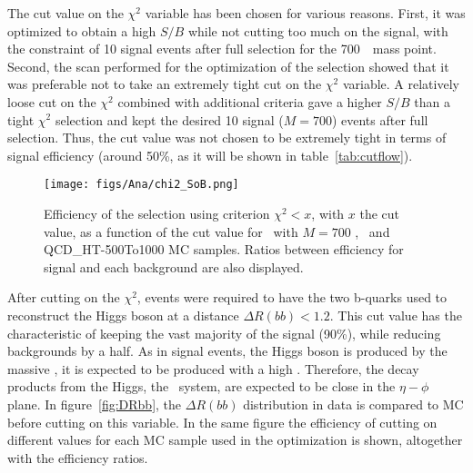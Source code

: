 The cut value on the $\chi^{2}$ variable has been chosen for various reasons. First, it was optimized to obtain a high $S/B$ while not cutting too much on the signal, with the constraint of 10 signal events after full selection for the 700~\GeVcc~mass point. Second, the scan performed for the optimization of the selection showed that it was preferable not to take an extremely tight cut on the $\chi^{2}$ variable. A relatively loose cut on the $\chi^{2}$ combined with additional criteria gave a higher $S/B$ than a tight $\chi^{2}$ selection and kept the desired 10 signal (${M=700}$\GeVcc) events after full selection.  Thus, the cut value was not chosen to be extremely tight in terms of signal efficiency (around 50\%, as it will be shown in table~\ref{tab:cutflow}).

\begin{figure}[!Hhtbp]
  \begin{center}
    \texttt{[image: figs/Ana/chi2\_SoB.png]}
    \caption{Efficiency of the selection using criterion $\chi^{2}<x$, with $x$ the cut value, as a function of the cut value for \Tp~with $M=700$ \GeVcc, \ttbar~and QCD\_HT-500To1000 MC samples. Ratios between efficiency for signal and each background are also displayed.}
    \label{fig:chi2cut}
  \end{center}
\end{figure}

After cutting on the $\chi^{2}$, events were required to have the two b-quarks used to reconstruct the Higgs boson at a distance $\Delta R(bb)<1.2$. This cut value has the characteristic of keeping the vast majority of the signal (90\%), while reducing backgrounds by a half. As in signal events, the Higgs boson is produced by the massive \Tp, it is expected to be produced with a high \pt. Therefore, the decay products from the Higgs, the \bbbar~system, are expected to be close in the $\eta-\phi$ plane. In figure~\ref{fig:DRbb}, the $\Delta R(bb)$ distribution in data is compared to MC before cutting on this variable. In the same figure the efficiency of cutting on different values for each MC sample used in the optimization is shown, altogether with the efficiency ratios. %

